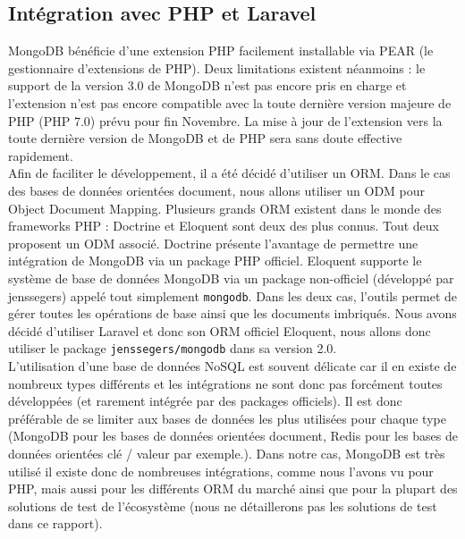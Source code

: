 \subsection{Intégration avec PHP et Laravel} %
\label{sub:integration_avec_php_et_laravel}

	MongoDB bénéficie d'une extension PHP facilement installable via PEAR (le gestionnaire d'extensions de PHP). Deux limitations existent néanmoins : le support de la version 3.0 de MongoDB n'est pas encore pris en charge et l'extension n'est pas encore compatible avec la toute dernière version majeure de PHP (PHP 7.0) prévu pour fin Novembre. La mise à jour de l'extension vers la toute dernière version de MongoDB et de PHP sera sans doute effective rapidement.\\

	Afin de faciliter le développement, il a été décidé d'utiliser un ORM. Dans le cas des bases de données orientées document, nous allons utiliser un ODM pour Object Document Mapping. Plusieurs grands ORM existent dans le monde des frameworks PHP : Doctrine et Eloquent sont deux des plus connus. Tout deux proposent un ODM associé. Doctrine présente l'avantage de permettre une intégration de MongoDB via un package PHP officiel. Eloquent supporte le système de base de données MongoDB via un package non-officiel (développé par jenssegers) appelé tout simplement \verb|mongodb|. Dans les deux cas, l'outils permet de gérer toutes les opérations de base ainsi que les documents imbriqués. Nous avons décidé d'utiliser Laravel et donc son ORM officiel Eloquent, nous allons donc utiliser le package \verb|jenssegers/mongodb| dans sa version 2.0.\\

	L'utilisation d'une base de données NoSQL est souvent délicate car il en existe de nombreux types différents et les intégrations ne sont donc pas forcément toutes développées (et rarement intégrée par des packages officiels). Il est donc préférable de se limiter aux bases de données les plus utilisées pour chaque type (MongoDB pour les bases de données orientées document, Redis pour les bases de données orientées clé / valeur par exemple.). Dans notre cas, MongoDB est très utilisé il existe donc de nombreuses intégrations, comme nous l'avons vu pour PHP, mais aussi pour les différents ORM du marché ainsi que pour la plupart des solutions de test de l'écosystème (nous ne détaillerons pas les solutions de test dans ce rapport).


